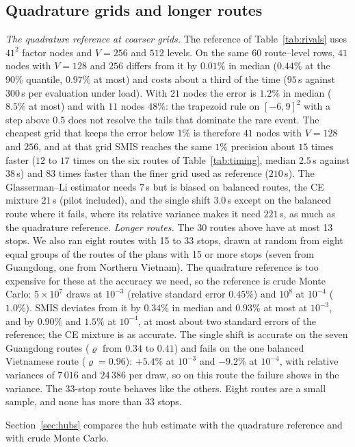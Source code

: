 \documentclass[ijoc,sglanonrev]{informs4}
\begin{document}
\begin{APPENDICES}
\section{Quadrature grids and longer routes}
\label{sec:grids}
\emph{The quadrature reference at coarser grids.} The reference of
Table~\ref{tab:rivals} uses $41^2$ factor nodes and $V=256$ and $512$ levels.
On the same 60 route--level rows, $41$ nodes with $V=128$ and $256$ differs
from it by $0.01\%$ in median ($0.44\%$ at the 90\% quantile, $0.97\%$ at
most) and costs about a third of the time ($95$\,s against $300$\,s per
evaluation under load). With $21$ nodes the error is $1.2\%$ in median
($8.5\%$ at most) and with $11$ nodes $48\%$: the trapezoid rule on
$[-6,9]^2$ with a step above $0.5$ does not resolve the tails that dominate
the rare event. The cheapest grid that keeps the error below $1\%$ is therefore
$41$ nodes with $V=128$ and $256$, and at that grid SMIS reaches the same
$1\%$ precision about $15$ times faster ($12$ to $17$ times on the six routes
of Table~\ref{tab:timing}, median $2.5$\,s against $38$\,s) and $83$ times
faster than the finer grid used as reference ($210$\,s). The Glasserman--Li
estimator needs $7$\,s but is biased on balanced routes, the CE mixture $21$\,s
(pilot included), and the single shift $3.0$\,s except on the balanced route
where it fails, where its relative variance makes it need $221$\,s, as much as
the quadrature reference.
\emph{Longer routes.} The 30 routes above have at most 13 stops. We also ran
eight routes with 15 to 33 stops, drawn at random from eight equal groups of the
routes of the plans with 15 or more stops (seven from Guangdong, one from
Northern Vietnam). The quadrature reference is too expensive for these at the
accuracy we need, so the reference is crude Monte Carlo: $5\times10^7$ draws at
$10^{-3}$ (relative standard error $0.45\%$) and $10^8$ at $10^{-4}$
($1.0\%$). SMIS deviates from it by $0.34\%$ in median and $0.93\%$ at most at
$10^{-3}$, and by $0.90\%$ and $1.5\%$ at $10^{-4}$, at most about two standard
errors of the reference; the CE mixture is as accurate. The single shift is
accurate on the seven Guangdong routes ($\varrho$ from $0.34$ to $0.41$) and
fails on the one balanced Vietnamese route ($\varrho=0.96$): $+5.4\%$ at
$10^{-3}$ and $-9.2\%$ at $10^{-4}$, with relative variances of $7\,016$ and
$24\,386$ per draw, so on this route the failure shows in the variance. The
$33$-stop route behaves like the others. Eight routes are a small sample, and
none has more than 33 stops.

Section~\ref{sec:hubs} compares the hub estimate with the quadrature reference and with crude Monte Carlo.



\end{APPENDICES}
\end{document}
